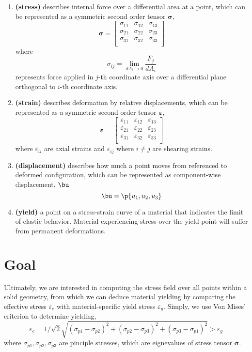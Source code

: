 \documentclass[11pt]{article}
\newcommand{\bheading}[1]{\textbf{(#1)}}
\newcommand{\bsigma}{\boldsymbol{\sigma}}
\newcommand{\bepsilon}{\boldsymbol{\varepsilon}}
\renewcommand{\epsilon}{\varepsilon}
\begin{document}
\begin{enumerate}
    \item \bheading{stress} describes internal force over a differential area at a point, which can be represented as a symmetric second order tensor $\bsigma$,
    \[
        \bsigma = 
        \begin{bmatrix}
            \sigma_{11} & \sigma_{12} & \sigma_{13} \\
            \sigma_{21} & \sigma_{22} & \sigma_{23} \\
            \sigma_{31} & \sigma_{32} & \sigma_{33} \\
        \end{bmatrix}    
    \]
    where
    \[
        \sigma_{ij} = \lim_{dA_i \to 0} \dfrac{F_j}{dA_i}
    \] 
    represents force applied in $j$-th coordinate axis over a differential plane orthogonal to $i$-th coordinate axis. 
    \item \bheading{strain} describes deformation by relative displacements, which can be represented as a symmetric second order tensor $\bepsilon$,
    \[
        \bepsilon = 
        \begin{bmatrix}
            \epsilon_{11} & \epsilon_{12} & \epsilon_{13} \\
            \epsilon_{21} & \epsilon_{22} & \epsilon_{23} \\
            \epsilon_{31} & \epsilon_{32} & \epsilon_{33} \\
        \end{bmatrix}
    \]
    where $\epsilon_{ii}$ are axial strains and $\epsilon_{ij}$ where $i\neq j$ are shearing strains.
    \item \bheading{displacement} describes how much a point moves from referenced to deformed configuration, which can be represented as component-wise displacement, $\bu$
    \[
        \bu = \p{u_1, u_2, u_3}
    \]
    \item \bheading{yield} a point on a stress-strain curve of a material that indicates the limit of elastic behavior. Material experiencing stress over the yield point will suffer from permanent deformations.
\end{enumerate}


\section*{Goal}

Ultimately, we are interested in computing the stress field over all points within a solid geometry, from which we can deduce material yielding by comparing the effective stress $\epsilon_e$ with material-specific yield stress $\epsilon_y$. Simply, we use Von Mises' criterion to determine yielding, 
\[
    \epsilon_e = 1/\sqrt{2} \sqrt{
        (\sigma_{p1} - \sigma_{p2})^2 
        + (\sigma_{p2} - \sigma_{p3})^2 
        + (\sigma_{p3} - \sigma_{p1})^2
    } > \epsilon_y
\]
where $\sigma_{p1}, \sigma_{p2}, \sigma_{p3}$ are pinciple stresses, which are eignevalues of stress tensor $\bsigma$.
\end{document}
